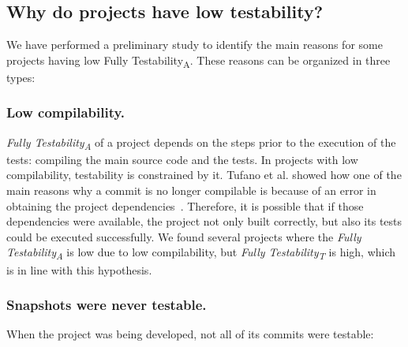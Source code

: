 
\subsection{Why do projects have low testability?}
\label{sec:low-testability}

We have performed a preliminary study to identify the main reasons for some projects having low Fully Testability\textsubscript{A}. 
These reasons can be organized in three types:

\subsubsection{Low compilability.} 

\textit{Fully Testability\textsubscript{A}} of a project depends on the steps prior to the execution of the tests: compiling the main source code and the tests.
In projects with low compilability, testability is constrained by it.
Tufano et al. showed how one of the main reasons why a commit is no longer compilable is because of an error in obtaining the project dependencies~\cite{tufano2017there}. 
Therefore, it is possible that if those dependencies were available, the project not only built correctly, but also its tests could be executed successfully. 
We found several projects where the \textit{Fully Testability\textsubscript{A}} is low due to low compilability, but \textit{Fully Testability\textsubscript{T}} is high, which is in line with this hypothesis.

\subsubsection{Snapshots were never testable.} When the project was being developed, not all of its commits were testable:

